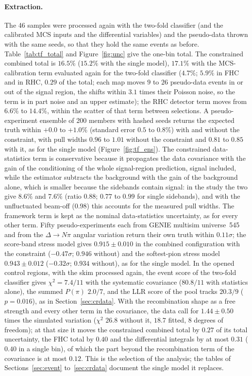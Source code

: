 \documentclass[11pt,a4paper]{article}
\begin{document}
\paragraph{Extraction.} The 46 samples were processed again with the two-fold classifier (and the calibrated MCS inputs
and the differential variables) and the pseudo-data thrown with the same seeds, so that they hold the same events as
before. Table~\ref{tab:tf_total} and Figure~\ref{fig:unc} give the one-bin total. The constrained combined total is $16.5\%$ ($15.2\%$ with the
single model), $17.1\%$ with the MCS-calibration term evaluated again for the two-fold classifier ($4.7\%$; $5.9\%$
in FHC and in RHC, $0.29$ of the total; each map moves $9$ to $26$ pseudo-data events in or out of the signal region,
the shifts within $3.1$ times their Poisson noise, so the term is in part noise and an upper estimate); the RHC detector term moves from $6.6\%$ to $14.4\%$, within the
scatter of that term between selections. A pseudo-experiment ensemble of 200 members with hashed seeds returns the
expected truth within $+0.0$ to $+1.0\%$ (standard error $0.5$ to $0.8\%$) with and without the constraint, with pull
widths $0.96$ to $1.01$ without the constraint and $0.81$ to $0.85$ with it, as for the single model
(Figure~\ref{fig:tf_ens}). The constrained data-statistics term is conservative because it propagates the data
covariance with the gain of the conditioning of the whole signal-region prediction, signal included, while the
estimator subtracts the background with the gain of the background alone, which is smaller because the sidebands contain
signal: in the study the two give $8.6\%$ and $7.6\%$ (ratio $0.88$; $0.77$ to $0.99$ for single sidebands), and with
the unfluctuated beam-off ($0.98$) this accounts for the measured pull widths. The framework term is kept as the
nominal data-statistics uncertainty, as for every other term. Fifty pseudo-experiments each from GENIE multisim universe~545 and from the $\Delta\to N\pi$
angular variation return their own truth within $0.11\sigma$; the score-band stress model gives $0.915\pm0.010$ in the
combined configuration with the constraint ($-0.47\sigma$; $0.946$ without) and the softest-pion stress model
$0.943\pm0.012$ ($-0.32\sigma$; $0.934$ without), as for the single model. In the opened control regions, with the
skim processed again, the event score of the two-fold classifier gives $\chi^2=7.4/11$ with the systematic covariance
($80.8/11$ with statistics alone), the summed $P(\pi)$ $2.0/7$, and the LLR score of the pool tracks
$20.3/9$ ($p=0.016$), as in Section~\ref{sec:crdata}. With the recombination shape as a free strength and every other
term in the covariance, the data call for $1.44\pm0.50$ times the simulated variation ($\chi^2$ $26.8$ without it,
$18.7$ fitted, 8 degrees of freedom); at that size it moves the constrained combined total by $0.27$ of its total
uncertainty, the FHC total by $0.40$ and the differential integrals by at most $0.31$ ($0.40$ in a single bin), of which the
part beyond the recombination term of the covariance is at most $0.12$. This is the
selection of the analysis; the tables of Sections~\ref{sec:event} to~\ref{sec:crdata} document the single model it
replaces.
\end{document}
